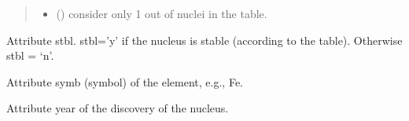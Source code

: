 \documentclass[letterpaper,10pt,english]{sphinxmanual}
\begin{document}
\begin{fulllineitems}
\begin{fulllineitems}
\begin{quote}
\begin{description}
\begin{itemize}
\item {} 
\sphinxAtStartPar
{} (\sphinxstyleliteralemphasis{\sphinxupquote{, }}) \textendash{} consider only 1 out of  nuclei in the table.

\end{itemize}

\end{description}\end{quote}

\end{fulllineitems}


\begin{fulllineitems}
\label{\detokenize{source/api/setup_masses:nucleardatapy.setup_masses.SetupMasses.stbl}}
\pysigstartsignatures
{}
\pysigstopsignatures
\sphinxAtStartPar
Attribute stbl. stbl=’y’ if the nucleus is stable (according to the table). Otherwise stbl = ‘n’.

\end{fulllineitems}


\begin{fulllineitems}
\label{\detokenize{source/api/setup_masses:nucleardatapy.setup_masses.SetupMasses.symb}}
\pysigstartsignatures
{}
\pysigstopsignatures
\sphinxAtStartPar
Attribute symb (symbol) of the element, e.g., Fe.

\end{fulllineitems}


\begin{fulllineitems}
\label{\detokenize{source/api/setup_masses:nucleardatapy.setup_masses.SetupMasses.year}}
\pysigstartsignatures
{}
\pysigstopsignatures
\sphinxAtStartPar
Attribute year of the discovery of the nucleus.

\end{fulllineitems}


\end{fulllineitems}
\end{document}
